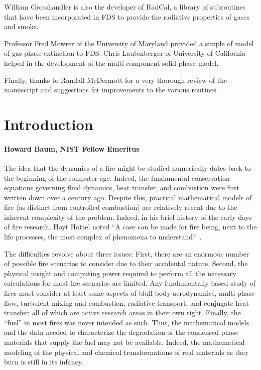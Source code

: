 \documentclass[11pt]{book}
\begin{document}
William Grosshandler is also the developer of RadCal, a library of
subroutines that have been incorporated in FDS to provide the
radiative properties of gases and smoke.

Professor Fred Mowrer of the University of Maryland provided a simple
of model of gas phase extinction to FDS. Chris Lautenberger of
University of California helped in the development of the
multi-component solid phase model.

Finally, thanks to Randall McDermott for a very thorough review of the manuscript and suggestions for improvements
to the various routines.









\tableofcontents

\mainmatter


\chapter{Introduction}
\subsubsection{Howard Baum, NIST Fellow Emeritus}

The idea that the dynamics of a fire might be studied numerically dates back
to the beginning of the computer age. Indeed, the fundamental
conservation equations governing fluid dynamics, heat transfer, and
combustion were first written down over a century ago.
Despite this, practical mathematical models of fire
(as distinct from controlled combustion) are relatively recent due
to the inherent complexity of the problem.
Indeed, in his brief history of the early days of fire research,
Hoyt Hottel noted ``A case can be made for fire being,
next to the life processes, the most complex of phenomena to understand''~\cite{Hottel:1}.

The difficulties revolve about three issues:
First, there are an enormous number of possible fire scenarios
to consider due to their accidental nature. Second, the physical
insight and computing power required to perform all the necessary calculations
for most fire scenarios are limited. Any fundamentally based study of fires
must consider at least some aspects of bluff body aerodynamics, multi-phase flow,
turbulent mixing and combustion, radiative transport, and conjugate heat transfer;
all of which are active research areas in their own right.
Finally, the ``fuel'' in most fires was never intended as such.
Thus, the mathematical models and the data needed to characterize the
degradation of the condensed phase materials that supply the fuel may not be available.
Indeed, the mathematical modeling of the physical and
chemical transformations of real materials as they burn is still in its infancy.
\end{document}

